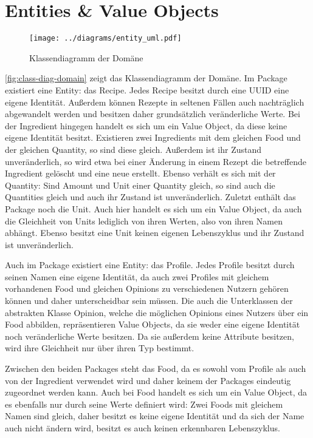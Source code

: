 \section{Entities \& Value Objects}

\begin{figure}[ht!]
    \texttt{[image: ../diagrams/entity\_uml.pdf]}
    \caption{Klassendiagramm der Domäne}
    \label{fig:class-diag-domain}
\end{figure}

\autoref{fig:class-diag-domain} zeigt das Klassendiagramm der Domäne. Im Package  existiert eine Entity: das Recipe. Jedes Recipe besitzt durch eine UUID eine eigene Identität. Außerdem können Rezepte in seltenen Fällen auch nachträglich abgewandelt werden und besitzen daher grundsätzlich veränderliche Werte. Bei der Ingredient hingegen handelt es sich um ein Value Object, da diese keine eigene Identität besitzt. Existieren zwei Ingredients mit dem gleichen Food und der gleichen Quantity, so sind diese gleich. Außerdem ist ihr Zustand unveränderlich, so wird etwa bei einer Änderung in einem Rezept die betreffende Ingredient gelöscht und eine neue erstellt. Ebenso verhält es sich mit der Quantity: Sind Amount und Unit einer Quantity gleich, so sind auch die Quantities gleich und auch ihr Zustand ist unveränderlich. Zuletzt enthält das Package noch die Unit. Auch hier handelt es sich um ein Value Object, da auch die Gleichheit von Units lediglich von ihren Werten, also von ihren Namen abhängt. Ebenso besitzt eine Unit keinen eigenen Lebenszyklus und ihr Zustand ist unveränderlich.

Auch im Package  existiert eine Entity: das Profile. Jedes Profile besitzt durch seinen Namen eine eigene Identität, da auch zwei Profiles mit gleichem vorhandenen Food und gleichen Opinions zu verschiedenen Nutzern gehören können und daher unterscheidbar sein müssen. Die auch die Unterklassen der abstrakten Klasse Opinion, welche die möglichen Opinions eines Nutzers über ein Food abbilden, repräsentieren Value Objects, da sie weder eine eigene Identität noch veränderliche Werte besitzen. Da sie außerdem keine Attribute besitzen, wird ihre Gleichheit nur über ihren Typ bestimmt.

Zwischen den beiden Packages steht das Food, da es sowohl vom Profile als auch von der Ingredient verwendet wird und daher keinem der Packages eindeutig zugeordnet werden kann. Auch bei Food handelt es sich um ein Value Object, da es ebenfalls nur durch seine Werte definiert wird: Zwei Foods mit gleichem Namen sind gleich, daher besitzt es keine eigene Identität und da sich der Name auch nicht ändern wird, besitzt es auch keinen erkennbaren Lebenszyklus. 

